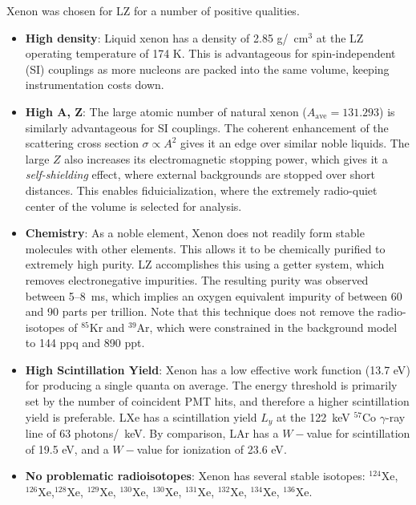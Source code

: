 Xenon was chosen for LZ for a number of positive qualities.
\begin{itemize}
    \item \textbf{High density}:
    Liquid xenon has a density of 2.85 g/~cm$^3$ at the LZ operating temperature of 174 K. 
    This is advantageous for spin-independent (SI) couplings as more nucleons are packed into the same volume, keeping instrumentation costs down.
    \item \textbf{High A, Z}:
    The large atomic number of natural xenon ($A_{\text{ave}}= 131.293$) is similarly advantageous for SI couplings.
    The coherent enhancement of the scattering cross section $\sigma \propto A^2$ gives it an edge over similar noble liquids.
    The large $Z$ also increases its electromagnetic stopping power, which gives it a \textit{self-shielding} effect, where external backgrounds are stopped over short distances.
    This enables fiduicialization, where the extremely radio-quiet center of the volume is selected for analysis.
    \item \textbf{Chemistry}:
    As a noble element, Xenon does not readily form stable molecules with other elements.
    This allows it to be chemically purified to extremely high purity.
    LZ accomplishes this using a getter system, which removes electronegative impurities.
    The resulting purity was observed between 5--8~ms\cite{aalbers_first_2022}, which implies an oxygen equivalent impurity of between 60 and 90 parts per trillion\cite{bakale_effect_1976}.
    Note that this technique does not remove the radio-isotopes of $^{85}$Kr and $^{39}$Ar, which were constrained in the background model to 144 ppq and 890 ppt\cite{aalbers_background_2022}.
    \item \textbf{High Scintillation Yield}:
    Xenon has a low effective work function (13.7 eV\cite{dahl_physics_2009}) for producing a single quanta on average.
    The energy threshold is primarily set by the number of coincident PMT hits, and therefore a higher scintillation yield is preferable.
    LXe has a scintillation yield $L_y$ at the 122~keV $^{57}$Co $\gamma$-ray line of 63 photons/~keV\cite{lenardo_global_2015}.
    By comparison, LAr has a $W-$value for scintillation of 19.5 eV\cite{doke_absolute_2002}, and a $W-$value for ionization of 23.6 eV\cite{miyajima_average_1974}.
    \item \textbf{No problematic radioisotopes}:
    Xenon has several stable isotopes: $^{124}$Xe, $^{126}$Xe,$^{128}$Xe, $^{129}$Xe, $^{130}$Xe, $^{130}$Xe, $^{131}$Xe, $^{132}$Xe, $^{134}$Xe, $^{136}$Xe.

\end{itemize}

